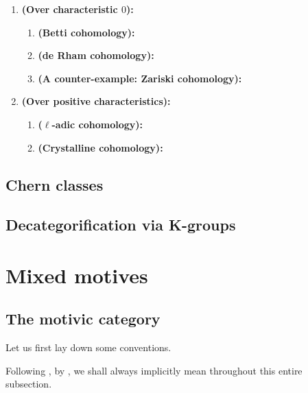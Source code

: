                 \begin{example}
                    \noindent
                    \begin{enumerate}
                        \item \textbf{(Over characteristic $0$):} 
                            \begin{enumerate}
                                \item \textbf{(Betti cohomology):}
                                \item \textbf{(de Rham cohomology):}
                                \item \textbf{(A counter-example: Zariski cohomology):}
                            \end{enumerate}
                        \item \textbf{(Over positive characteristics):}
                            \begin{enumerate}
                                \item \textbf{($\ell$-adic cohomology):}
                                \item \textbf{(Crystalline cohomology):}
                            \end{enumerate}
                    \end{enumerate}
                \end{example}
                
        \subsection{Chern classes}
        
        \subsection{Decategorification via K-groups}
                
    \section{Mixed motives}
        \subsection{The motivic category}
            Let us first lay down some conventions.
            \begin{convention} \label{conv: motivic_category_scheme_convention}
                Following \cite[Subsection I.i.1.1, pp. 9]{levine_1998_mixed_motives}, by , we shall always implicitly mean  throughout this entire subsection. 
            \end{convention}
            
